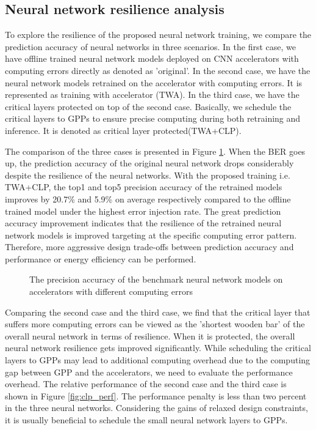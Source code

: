 \subsection{Neural network resilience analysis}
To explore the resilience of the proposed neural network training, we
compare the prediction accuracy of neural networks in three scenarios.
In the first case, we have offline trained neural network models deployed on 
CNN accelerators with computing errors directly as denoted as 'original'.
In the second case, we have the neural network models retrained on the 
accelerator with computing errors. It is represented as training with 
accelerator (TWA). In the third case, we have the critical layers 
protected on top of the second case. Basically, we schedule the critical layers to 
GPPs to ensure precise computing during both retraining and inference.
It is denoted as critical layer protected(TWA+CLP).

The comparison of the three cases is presented in Figure \ref{fig:softerror-accuracy}.
When the BER goes up, the prediction accuracy of the original neural network drops 
considerably despite the resilience of the neural networks. 
With the proposed training i.e. TWA+CLP, the top1 and top5 precision accuracy 
of the retrained models improves by 20.7\% and 5.9\% on average respectively 
compared to the offline trained model under the highest error injection rate. 
The great prediction accuracy improvement indicates that the resilience 
of the retrained neural network models is improved targeting at the 
specific computing error pattern. Therefore, more aggressive design trade-offs 
between prediction accuracy and performance or energy efficiency can be performed. 
\begin{figure}
        \center
        \qquad
        \qquad
        \caption{The precision accuracy of the benchmark neural network models on accelerators with different computing errors}
        \label{fig:softerror-accuracy}
\end{figure}


Comparing the second case and the third case, we find that the critical layer 
that suffers more computing errors can be viewed as the 'shortest 
wooden bar' of the overall neural network in terms of resilience. When it is protected, 
the overall neural network resilience gets improved significantly.
While scheduling the critical layers to GPPs may lead to additional computing overhead 
due to the computing gap between GPP and the accelerators, we need to evaluate the 
performance overhead. The relative performance of the second case and the third case 
is shown in Figure \ref{fig:clp_perf}. The performance penalty is less than two percent 
in the three neural networks. Considering the gains of relaxed design constraints, 
it is usually beneficial to schedule the small neural network layers to GPPs. 

